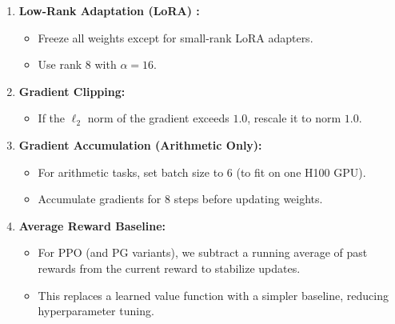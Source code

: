 \documentclass{article}
\begin{document}
\begin{enumerate}
    \item \textbf{Low-Rank Adaptation (LoRA) \citep{hu2022lora}:} 
    \begin{itemize}
        \item Freeze all weights except for small-rank LoRA adapters.
        \item Use rank 8 with $\alpha = 16$.
    \end{itemize}

    \item \textbf{Gradient Clipping:} 
    \begin{itemize}
        \item If the $\ell_2$ norm of the gradient exceeds $1.0$, rescale it to norm $1.0$.
    \end{itemize}

    \item \textbf{Gradient Accumulation (Arithmetic Only):} 
    \begin{itemize}
        \item For arithmetic tasks, set batch size to 6 (to fit on one H100 GPU).
        \item Accumulate gradients for 8 steps before updating weights.
    \end{itemize}

    \item \textbf{Average Reward Baseline:} 
    \begin{itemize}
        \item For PPO (and PG variants), we subtract a running average of past rewards from the current reward to stabilize updates.
        \item This replaces a learned value function with a simpler baseline, reducing hyperparameter tuning.
    \end{itemize}


\end{enumerate}
\end{document}
